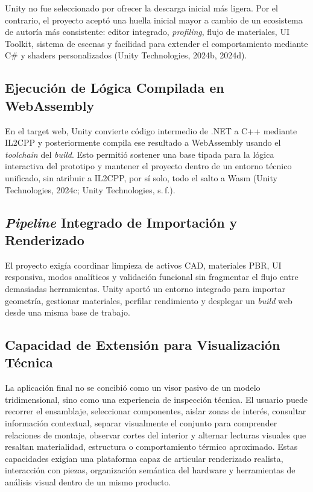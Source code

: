 Unity no fue seleccionado por ofrecer la descarga inicial más ligera. Por el contrario, el proyecto aceptó una huella inicial mayor a cambio de un ecosistema de autoría más consistente: editor integrado, \textit{profiling}, flujo de materiales, UI Toolkit, sistema de escenas y facilidad para extender el comportamiento mediante C\# y shaders personalizados (Unity Technologies, 2024b, 2024d).

\subsection{Ejecución de Lógica Compilada en WebAssembly}

En el target web, Unity convierte código intermedio de .NET a C++ mediante IL2CPP y posteriormente compila ese resultado a WebAssembly usando el \textit{toolchain} del \textit{build}. Esto permitió sostener una base tipada para la lógica interactiva del prototipo y mantener el proyecto dentro de un entorno técnico unificado, sin atribuir a IL2CPP, por sí solo, todo el salto a Wasm (Unity Technologies, 2024c; Unity Technologies, s.\,f.).

\subsection{\textit{Pipeline} Integrado de Importación y Renderizado}

El proyecto exigía coordinar limpieza de activos CAD, materiales PBR, UI responsiva, modos analíticos y validación funcional sin fragmentar el flujo entre demasiadas herramientas. Unity aportó un entorno integrado para importar geometría, gestionar materiales, perfilar rendimiento y desplegar un \textit{build} web desde una misma base de trabajo.

\subsection{Capacidad de Extensión para Visualización Técnica}

La aplicación final no se concibió como un visor pasivo de un modelo tridimensional, sino como una experiencia de inspección técnica. El usuario puede recorrer el ensamblaje, seleccionar componentes, aislar zonas de interés, consultar información contextual, separar visualmente el conjunto para comprender relaciones de montaje, observar cortes del interior y alternar lecturas visuales que resaltan materialidad, estructura o comportamiento térmico aproximado. Estas capacidades exigían una plataforma capaz de articular renderizado realista, interacción con piezas, organización semántica del hardware y herramientas de análisis visual dentro de un mismo producto.

